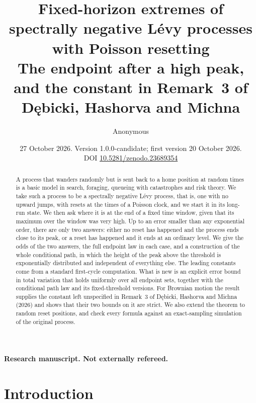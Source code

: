 \documentclass[11pt,a4paper]{article}
\title{Fixed-horizon extremes of spectrally negative L\'evy processes with Poisson resetting\\[4pt]
\large The endpoint after a high peak, and the constant in Remark~3 of D\k{e}bicki, Hashorva and Michna}
\author{Anonymous}
\date{27 October 2026. Version 1.0.0-candidate; first version 20 October 2026.\\ DOI \href{https://doi.org/10.5281/zenodo.23689354}{10.5281/zenodo.23689354}}
\begin{document}
\maketitle
\thispagestyle{fancy}

\noindent\textbf{Research manuscript. Not externally refereed.}

\begin{abstract}
\noindent
A process that wanders randomly but is sent back to a home position at random times is a basic model in search, foraging, queueing with catastrophes and risk theory. We take such a process to be a spectrally negative L\'evy process, that is, one with no upward jumps, with resets at the times of a Poisson clock, and we start it in its long-run state. We then ask where it is at the end of a fixed time window, given that its maximum over the window was very high. Up to an error smaller than any exponential order, there are only two answers: either no reset has happened and the process ends close to its peak, or a reset has happened and it ends at an ordinary level. We give the odds of the two answers, the full endpoint law in each case, and a construction of the whole conditional path, in which the height of the peak above the threshold is exponentially distributed and independent of everything else. The leading constants come from a standard first-cycle computation. What is new is an explicit error bound in total variation that holds uniformly over all endpoint sets, together with the conditional path law and its fixed-threshold versions. For Brownian motion the result supplies the constant left unspecified in Remark~3 of D\k{e}bicki, Hashorva and Michna (2026) and shows that their two bounds on it are strict. We also extend the theorem to random reset positions, and check every formula against an exact-sampling simulation of the original process.
\end{abstract}

\section{Introduction}\label{sec:intro}
\end{document}
